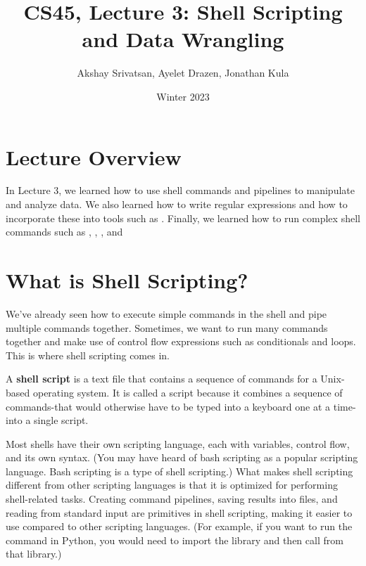 \documentclass{article}
\title{CS45, Lecture 3: Shell Scripting and Data Wrangling }
\author{Akshay Srivatsan, Ayelet Drazen, Jonathan Kula }
\date{Winter 2023}
\begin{document}
\maketitle

\tableofcontents

\section{Lecture Overview}
In Lecture 3, we learned how to use shell commands and pipelines to manipulate and analyze data. We also learned how to write regular expressions and how to incorporate these into tools such as . Finally, we learned how to run complex shell commands such as , , , and 

\section{What is Shell Scripting?}
We've already seen how to execute simple commands in the shell and pipe multiple commands together. Sometimes, we want to run many commands together and make use of control flow expressions such as conditionals and loops. This is where shell scripting comes in. 
\par
A \textbf{shell script} is a text file that contains a sequence of commands for a Unix-based operating system. It is called a script because it combines a sequence of commands-that would otherwise have to be typed into a keyboard one at a time-into a single script.
\par
Most shells have their own scripting language, each with variables, control flow, and its own syntax. (You may have heard of bash scripting as a popular scripting language. Bash scripting is a type of shell scripting.) What makes shell scripting different from other scripting languages is that it is optimized for performing shell-related tasks. Creating command pipelines, saving results into files, and reading from standard input are primitives in shell scripting, making it easier to use compared to other scripting languages. (For example, if you want to run the  command in Python, you would need to import the  library and then call  from that library.)
\end{document}

